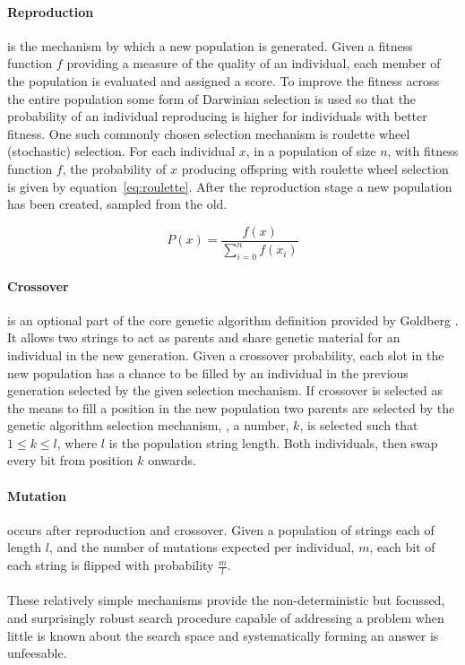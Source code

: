 \paragraph{Reproduction}
is the mechanism by which a new population is generated. Given a fitness function
$f$ providing a measure of the quality of an individual, each member of the
population is evaluated and
assigned a score. To improve the fitness across the entire population some form
of Darwinian selection is used so that the probability of an individual
reproducing is higher for individuals with better fitness.
One such commonly chosen selection mechanism is roulette wheel (stochastic) selection.
For each individual $x$, in a population of size $n$, with fitness function $f$,
the probability of $x$ producing offspring with roulette wheel
selection is given by equation~\ref{eq:roulette}. After the reproduction
stage a new population has been created, sampled from the old.

\begin{equation}
	P(x) = \frac{f(x)}{\sum_{i=0}^{n}f(x_{i})}
	\label{eq:roulette}
\end{equation}

\paragraph{Crossover} is an optional part of the core genetic algorithm definition
provided by Goldberg \cite{Goldberg:1989:GAS:534133}. It
allows two strings to act as parents and share genetic material for an individual
in the new generation. Given a crossover probability, each slot in the new population
has a chance to be filled by an individual in the previous generation selected
by the given selection mechanism. If crossover is selected as the means to
fill a position in the new population two parents are selected by the genetic
algorithm selection mechanism,
, a number, $k$,
is selected such that $1 \leq k \leq l$, where $l$ is the population string length.
Both individuals, then swap every bit from position $k$ onwards.

\paragraph{Mutation}
occurs after reproduction and crossover. Given a population of strings each of length
$l$, and the number of mutations expected per individual, $m$, each bit of each string
is flipped with probability $\frac{m}{l}$.

\paragraph{}
These relatively simple mechanisms provide the non-deterministic but focussed,
and surprisingly robust search procedure capable of addressing a problem when
little is known about the search space and systematically forming an answer is
unfeesable.

